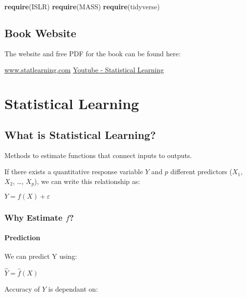\documentclass[]{book}
\newenvironment{Shaded}{\begin{snugshade}}{\end{snugshade}}
\newcommand{\KeywordTok}[1]{\textcolor[rgb]{0.13,0.29,0.53}{\textbf{#1}}}
\newcommand{\NormalTok}[1]{#1}
\theoremstyle{definition}
\theoremstyle{definition}
\theoremstyle{definition}
\theoremstyle{remark}
\begin{document}
\begin{Shaded}
\begin{Highlighting}[]
\KeywordTok{require}\NormalTok{(ISLR)}
\KeywordTok{require}\NormalTok{(MASS)}
\KeywordTok{require}\NormalTok{(tidyverse)}
\end{Highlighting}
\end{Shaded}

\section{Book Website}\label{book-website}

The website and free PDF for the book can be found here:

\href{http://www-bcf.usc.edu/~gareth/ISL/}{www.statlearning.com}
\href{https://www.youtube.com/channel/UC4OWDcPB1peiBXDfCSZ3h-w}{Youtube
- Statistical Learning}

\chapter{Statistical Learning}\label{statistical-learning}

\section{What is Statistical
Learning?}\label{what-is-statistical-learning}

Methods to estimate functions that connect inputs to outputs.

If there exists a quantitative response variable \(Y\) and \(p\)
different predictors (\(X_1\), \(X_2\), \ldots{}, \(X_p\)), we can write
this relationship as:

\(Y = f(X) + ε\)

\subsection{\texorpdfstring{Why Estimate
\emph{\(f\)}?}{Why Estimate f?}}\label{why-estimate-f}

\subsubsection{Prediction}\label{prediction}

We can predict Y using:

\(\hat{Y} = \hat{f}(X)\)

Accuracy of \(Y\) is dependant on:
\end{document}
